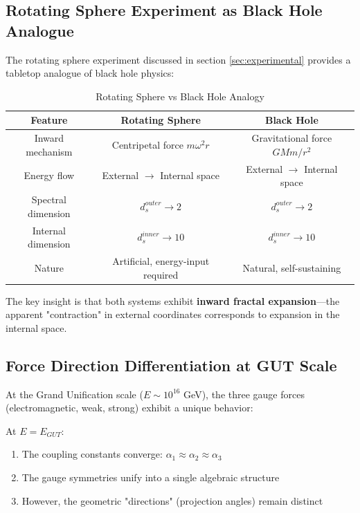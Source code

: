 \subsection{Rotating Sphere Experiment as Black Hole Analogue}

The rotating sphere experiment discussed in section \ref{sec:experimental} provides a tabletop analogue of black hole physics:

\begin{table}[htbp]
\centering
\caption{Rotating Sphere vs Black Hole Analogy}
\begin{tabular}{@{}ccc@{}}
\toprule
Feature & Rotating Sphere & Black Hole \\
\midrule
Inward mechanism & Centripetal force $m\omega^2 r$ & Gravitational force $GMm/r^2$ \\
Energy flow & External $\to$ Internal space & External $\to$ Internal space \\
Spectral dimension & $d_s^{outer} \to 2$ & $d_s^{outer} \to 2$ \\
Internal dimension & $d_s^{inner} \to 10$ & $d_s^{inner} \to 10$ \\
Nature & Artificial, energy-input required & Natural, self-sustaining \\
\bottomrule
\end{tabular}
\label{tab:sphere_bh_analogy}
\end{table}

The key insight is that both systems exhibit \textbf{inward fractal expansion}---the apparent "contraction" in external coordinates corresponds to expansion in the internal space.

\subsection{Force Direction Differentiation at GUT Scale}

At the Grand Unification scale ($E \sim 10^{16}$ GeV), the three gauge forces (electromagnetic, weak, strong) exhibit a unique behavior:

\begin{theorem}
At $E = E_{GUT}$:
\begin{enumerate}
    \item The coupling constants converge: $\alpha_1 \approx \alpha_2 \approx \alpha_3$
    \item The gauge symmetries unify into a single algebraic structure
    \item However, the geometric "directions" (projection angles) remain distinct
\end{enumerate}
\end{theorem}

